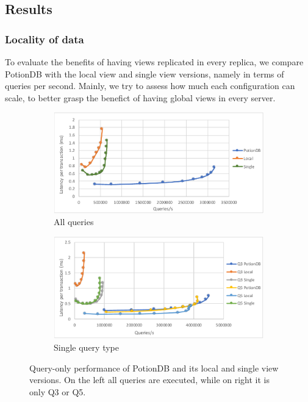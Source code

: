 \documentclass{vldb}
\newcommand{\grumbler}[2]{{\color{red}{\bf #1:} #2}}
\renewcommand{\grumbler}[2]{}
\newcommand{\andre}[1]{\grumbler{andre}{#1}}
\begin{document}
\subsection{Results}

\subsubsection{Locality of data}

\andre{Is it worth to mention how much the number of clients vary by test?}

To evaluate the benefits of having views replicated in every replica, we compare PotionDB with the local view and single view versions, namely in terms of queries per second.
Mainly, we try to assess how much each configuration can scale, to better grasp the benefict of having global views in every server.

\begin{figure}
	\centering
	\begin{subfigure}{.5\linewidth}
		\centering
		\includegraphics[width=.95\linewidth]{clientScale_cut}
		\caption{All queries}
		\label{fig:global_local_single}
	\end{subfigure}%
	\begin{subfigure}{.5\linewidth}
		\centering
		\includegraphics[width=.95\linewidth]{Q3vsQ5_cut}
		\caption{Single query type}
		\label{fig:q3q5}
	\end{subfigure}
	\caption{Query-only performance of PotionDB and its local and single view versions. On the left all queries are executed, while on right it is only Q3 or Q5.}
	\label{fig:query_only}
\end{figure}
\end{document}
